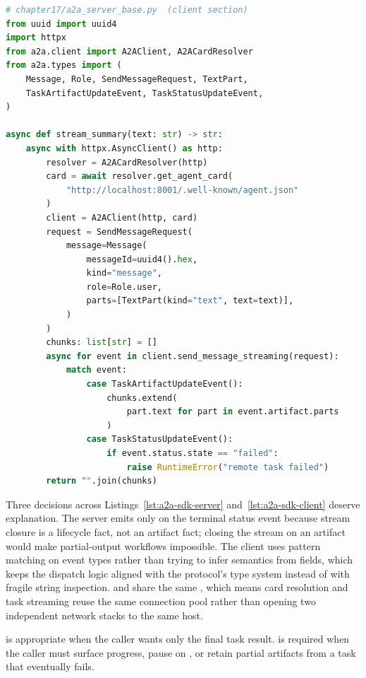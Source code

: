 \begin{lstlisting}[language=Python,
  caption={Client-side streaming loop with typed event dispatch},
  label={lst:a2a-sdk-client}]
# chapter17/a2a_server_base.py  (client section)
from uuid import uuid4
import httpx
from a2a.client import A2AClient, A2ACardResolver
from a2a.types import (
    Message, Role, SendMessageRequest, TextPart,
    TaskArtifactUpdateEvent, TaskStatusUpdateEvent,
)

async def stream_summary(text: str) -> str:
    async with httpx.AsyncClient() as http:
        resolver = A2ACardResolver(http)
        card = await resolver.get_agent_card(
            "http://localhost:8001/.well-known/agent.json"
        )
        client = A2AClient(http, card)
        request = SendMessageRequest(
            message=Message(
                messageId=uuid4().hex,
                kind="message",
                role=Role.user,
                parts=[TextPart(kind="text", text=text)],
            )
        )
        chunks: list[str] = []
        async for event in client.send_message_streaming(request):
            match event:
                case TaskArtifactUpdateEvent():
                    chunks.extend(
                        part.text for part in event.artifact.parts
                    )
                case TaskStatusUpdateEvent():
                    if event.status.state == "failed":
                        raise RuntimeError("remote task failed")
        return "".join(chunks)
\end{lstlisting}

Three decisions across Listings~\ref{lst:a2a-sdk-server}
and~\ref{lst:a2a-sdk-client} deserve explanation.
The server emits  only on the terminal status event
because stream closure is a lifecycle fact, not an artifact fact; closing
the stream on an artifact would make partial-output workflows impossible.
The client uses pattern matching on event types rather than trying to
infer semantics from fields, which keeps the dispatch logic aligned with
the protocol's type system instead of with fragile string inspection.
 and  share the same
, which means card resolution and task streaming
reuse the same connection pool rather than opening two independent network
stacks to the same host.

\begin{notebox}
 is appropriate when the caller wants only
the final task result.  is required when
the caller must surface progress, pause on , or
retain partial artifacts from a task that eventually fails.
\end{notebox}

